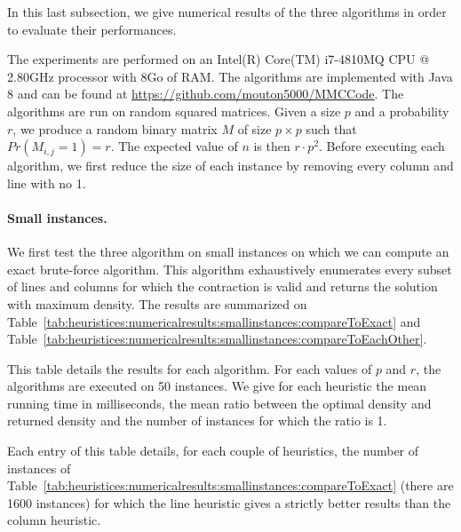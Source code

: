 In this last subsection, we give numerical results of the three algorithms in order to evaluate their performances.

The experiments are performed on an Intel(R) Core(TM) i7-4810MQ CPU @ 2.80GHz processor with 8Go of RAM. The algorithms are implemented with Java 8 and can be found at \url{https://github.com/mouton5000/MMCCode}. The algorithms are run on random squared matrices. Given a size $p$ and a probability $r$, we produce a random binary matrix $M$ of size $p \times p$ such that $Pr(M_{i,j} = 1) = r$. The expected value of $n$ is then $r \cdot p^2$. Before executing each algorithm, we first reduce the size of each instance by removing every column and line with no 1.

\paragraph{Small instances. }
We first test the three algorithm on small instances on which we can compute an exact brute-force algorithm. This algorithm exhaustively enumerates every subset of lines and columns for which the contraction is valid and returns the solution with maximum density. The results are summarized on Table~\ref{tab:heuristices:numericalresults:smallinstances:compareToExact} and  Table~\ref{tab:heuristices:numericalresults:smallinstances:compareToEachOther}.


\begin{table}[ht!]
	\centering
	\def\arraystretch{1.2}
	\setlength\tabcolsep{0.075cm}
	\scriptsize
	
	\caption{This table details the results for each algorithm. For each values of $p$ and $r$, the algorithms are executed on 50 instances. We give for each heuristic the mean running time in milliseconds, the mean ratio between the optimal density and returned density and the number of instances for which the ratio is 1.}
	\label{tab:heuristices:numericalresults:smallinstances:compareToExact}
\end{table}

\begin{table}[ht!]
	\centering
	\def\arraystretch{1.2}
	\setlength\tabcolsep{0.075cm}
	\scriptsize
	
	\caption{Each entry of this table details, for each couple of heuristics, the number of instances of Table~\ref{tab:heuristices:numericalresults:smallinstances:compareToExact} (there are 1600 instances) for which the line heuristic gives a strictly better results than the column heuristic. }
	\label{tab:heuristices:numericalresults:smallinstances:compareToEachOther}
\end{table}

